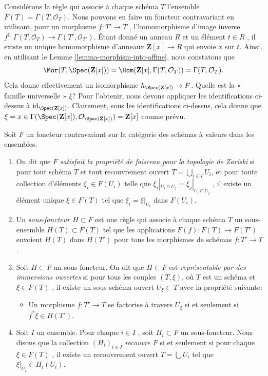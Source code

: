 \begin{example}
\label{example-global-sections}
Considérons la règle qui associe à chaque schéma  $T$  l'ensemble
 $F(T) = \Gamma(T, \mathcal{O}_T)$. Nous pouvons en faire un foncteur contravariant en utilisant, pour
un morphisme  $f : T' \to T$ , l'homomorphisme d'image inverse  $f^\sharp : \Gamma(T, \mathcal{O}_T) \to \Gamma(T', \mathcal{O}_{T'})$. Étant
donné un anneau  $R$  et un élément  $t \in R$ , il existe un unique
homomorphisme d'anneaux  $\mathbf{Z}[x] \to R$  qui envoie  $x$  sur  $t$.
Ainsi, en utilisant le Lemme  \ref{lemma-morphism-into-affine}, nous constatons que
$$
\Mor(T, \Spec(\mathbf{Z}[x])) =
\Hom(\mathbf{Z}[x], \Gamma(T, \mathcal{O}_T)) =
\Gamma(T, \mathcal{O}_T).
$$
Cela donne effectivement un isomorphisme  $h_{\Spec(\mathbf{Z}[x])} \to F$. Quelle est la « famille
universelle »  $\xi$? Pour l'obtenir, nous devons appliquer les
identifications ci-dessus à  $\text{id}_{\Spec(\mathbf{Z}[x])}$. Clairement, sous les identifications
ci-dessus, cela donne que  $\xi = x \in \Gamma(\Spec(\mathbf{Z}[x]),
\mathcal{O}_{\Spec(\mathbf{Z}[x])}) = \mathbf{Z}[x]$  comme prévu.
\end{example}

\begin{definition}
\label{definition-representable-by-open-immersions}
Soit  $F$  un foncteur contravariant sur la catégorie des schémas à valeurs
dans les ensembles.
\begin{enumerate}
\item On dit que  $F$   {\it  satisfait la propriété de
faisceau pour la topologie de Zariski}  si pour tout schéma  $T$ 
et tout recouvrement ouvert  $T = \bigcup_{i \in I} U_i$, et pour toute collection d'éléments
 $\xi_i \in F(U_i)$  telle que  $\xi_i|_{U_i \cap U_j} =
\xi_j|_{U_i \cap U_j}$ , il existe un élément unique  $\xi \in F(T)$  tel
que  $\xi_i = \xi|_{U_i}$  dans  $F(U_i)$.
\item Un  {\it  sous-foncteur  $H \subset F$}  est une règle
qui associe à chaque schéma  $T$  un sous-ensemble  $H(T) \subset F(T)$  tel que les
applications  $F(f) : F(T) \to F(T')$  envoient  $H(T)$  dans  $H(T')$  pour tous les
morphismes de schémas  $f : T' \to T$.
\item Soit  $H \subset F$  un sous-foncteur. On dit que  $H \subset F$  est
 {\it  représentable par des immersions ouvertes}  si
pour tous les couples  $(T, \xi)$, où  $T$  est un schéma et  $\xi \in F(T)$ ,
il existe un sous-schéma ouvert  $U_\xi \subset T$  avec la propriété suivante:
\begin{itemize}
\item[(*)] Un morphisme  $f : T' \to T$  se factorise à travers  $U_\xi$  si et seulement si
 $f^*\xi \in H(T')$.
\end{itemize}
\item Soit  $I$  un ensemble. Pour chaque  $i \in I$ , soit  $H_i \subset F$  un
sous-foncteur. Nous disons que la collection  $(H_i)_{i \in I}$   {\it 
recouvre  $F$}  si et seulement si pour chaque  $\xi \in F(T)$ , il
existe un recouvrement ouvert  $T = \bigcup U_i$  tel que  $\xi|_{U_i} \in H_i(U_i)$.
\end{enumerate}
\end{definition}

